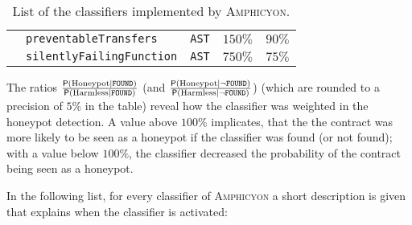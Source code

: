 \begin{table}[H]
{\begin{tabular}{@{}lllll@{}}
			                                                                & \texttt{preventableTransfers }          & \texttt{AST}        & \( 150 \% \)                                                                                                                                          & \( 90 \% \)                                                                                                                                                     \\
			                                                                & \texttt{silentlyFailingFunction}        & \texttt{AST}        & \( 750 \% \)                                                                                                                                          & \( 75 \% \)                                                                                                                                                     \\ \midrule
		\end{tabular}%
	}
	\caption{List of the classifiers implemented by \textsc{Amphicyon}.}
	\label{table:classifiers}
\end{table}

The ratios \( \frac{\textsf{P} \left( \textnormal{Honeypot} \mid \texttt{FOUND} \right)}{\textsf{P} \left( \textnormal{Harmless} \mid \texttt{FOUND} \right)} \) (and \( \frac{\textsf{P} \left( \textnormal{Honeypot} \mid \neg \texttt{FOUND} \right)}{\textsf{P} \left( \textnormal{Harmless} \mid \neg \texttt{FOUND} \right)} \)) (which are rounded to a precision of \( 5 \% \) in the table) reveal how the classifier was weighted in the honeypot detection. A value above \( 100 \% \) implicates, that the the contract was more likely to be seen as a honeypot if the classifier was found (or not found); with a value below \( 100 \% \), the classifier decreased the probability of the contract being seen as a honeypot.

In the following list, for every classifier of \textsc{Amphicyon} a short description is given that explains when the classifier is activated:

